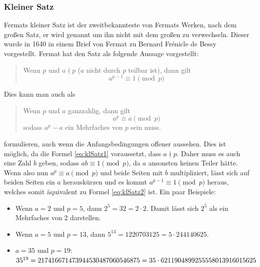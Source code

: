     \subsubsection{Kleiner Satz} \label{sec:klSatz}
        Fermats kleiner Satz ist der zweitbekannteste von Fermats Werken, nach dem großen Satz, er wird  genannt um ihn nicht mit dem großen zu verwechseln. Dieser wurde in 1640 in einem Brief von Fermat zu Bernard Frénicle de Bessy vorgestellt. Fermat hat den Satz als folgende Aussage vorgestellt:
        \begin{quote}
            Wenn $p$  und $a \nmid p$ ($a$ nicht durch $p$ teilbar ist), dann gilt
            \begin{equation} \label{eq:klSatz1}
                a^{p-1} \equiv 1 \pmod{p}
            \end{equation}
        \end{quote}
        
        Dies kann man auch als
        \begin{quote} 
            Wenn $p$  und $a$ ganzzahlig, dann gilt
            \begin{equation} \label{eq:klSatz2}
                a^p \equiv a \pmod{p}
            \end{equation}
            sodass $a^p - a$ ein Mehrfaches von $p$ sein muss.
        \end{quote}
        formulieren, auch wenn die Anfangsbedingungen offener aussehen. Dies ist möglich, da die Formel \ref{eq:klSatz1} voraussetzt, dass $a \nmid p$. Daher muss es auch eine Zahl $b$ geben, sodass $ab \equiv 1 \pmod{p}$, da $a$ ansonsten keinen Teiler hätte. Wenn also nun $a^p \equiv a \pmod{p}$ und beide Seiten mit $b$ multipliziert, lässt sich auf beiden Seiten ein $a$ herauskürzen und es kommt $a^{p-1} \equiv 1 \pmod{p}$ heraus, welches somit äquivalent zu Formel \ref{eq:klSatz2} ist. Ein paar Beispiele:
        \begin{itemize}
            \item Wenn $a=2$ und $p=5$, dann $2^{5} = 32 = 2 \cdot 2$. Damit lässt sich $2^{5}$ als ein Mehrfaches von 2 darstellen.
            \item Wenn $a=5$ und $p=13$, dann $5^{13} = 1220703125 = 5 \cdot 244140625$.
            \item $a=35$ und $p=19$: \quad $35^{19} = 217416671473944530487060546875 \\ = 35 \cdot 6211904899255558013916015625$ 
        \end{itemize}
        
